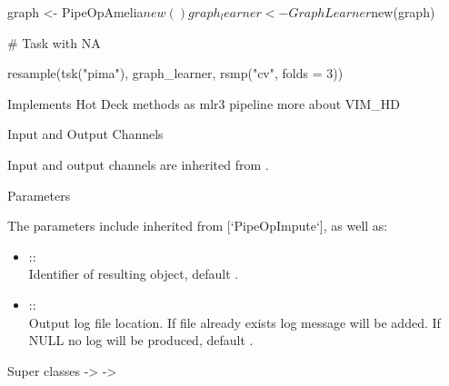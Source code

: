 \documentclass[letterpaper]{book}
\begin{document}
%
\begin{Examples}
\begin{ExampleCode}
{
  graph <- PipeOpAmelia$new() %
  graph_learner <- GraphLearner$new(graph)

  # Task with NA

  resample(tsk("pima"), graph_learner, rsmp("cv", folds = 3))
}
\end{ExampleCode}
\end{Examples}
%
\begin{Description}\relax
Implements Hot Deck methods as mlr3 pipeline more about VIM\_HD 
\end{Description}
%
\begin{Section}{Input and Output Channels}

Input and output channels are inherited from .
\end{Section}
%
\begin{Section}{Parameters}

The parameters include inherited from [`PipeOpImpute`], as well as: \\{}
\begin{itemize}

\item{}  :: \\{}
Identifier of resulting object, default .
\item{}  :: \\{}
Output log file location. If file already exists log message will be added. If NULL no log will be produced, default .

\end{itemize}

\end{Section}
%
\begin{Section}{Super classes}
 ->  -> 
\end{Section}
%
\end{document}
